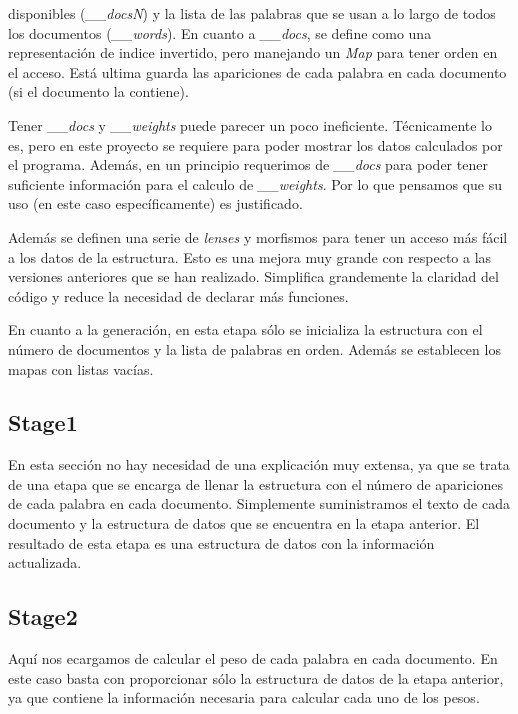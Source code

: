 \documentclass{nrfh-ish}
\begin{document}

disponibles (\textit{\_\_docsN}) y la lista de las palabras que se
usan a lo largo de todos los documentos (\textit{\_\_words}). En
cuanto a \textit{\_\_docs}, se define como una representación de
indice invertido, pero manejando un \textit{Map} para tener orden
en el acceso. Está ultima guarda las apariciones de cada palabra
en cada documento (si el documento la contiene).

Tener \textit{\_\_docs} y \textit{\_\_weights} puede parecer un
poco ineficiente. Técnicamente lo es, pero en este proyecto se
requiere para poder mostrar los datos calculados por el programa.
Además, en un principio requerimos de \textit{\_\_docs} para poder
tener suficiente información para el calculo de \textit{\_\_weights}.
Por lo que pensamos que su uso (en este caso específicamente) es
justificado.

Además se definen una serie de \textit{lenses} y morfismos para
tener un acceso más fácil a los datos de la estructura. Esto es una
mejora muy grande con respecto a las versiones anteriores que se
han realizado. Simplifica grandemente la claridad del código y
reduce la necesidad de declarar más funciones.

En cuanto a la generación, en esta etapa sólo se inicializa la
estructura con el número de documentos y la lista de palabras en
orden. Además se establecen los mapas con listas vacías.

\subsection{Stage1}

En esta sección no hay necesidad de una explicación muy extensa,
ya que se trata de una etapa que se encarga de llenar la estructura
con el número de apariciones de cada palabra en cada documento.
Simplemente suministramos el texto de cada documento y la
estructura de datos que se encuentra en la etapa anterior.
El resultado de esta etapa es una estructura de datos con la
información actualizada.

\subsection{Stage2}

Aquí nos ecargamos de calcular el peso de cada palabra en cada
documento. En este caso basta con proporcionar sólo la estructura
de datos de la etapa anterior, ya que contiene la información
necesaria para calcular cada uno de los pesos.
\end{document}
